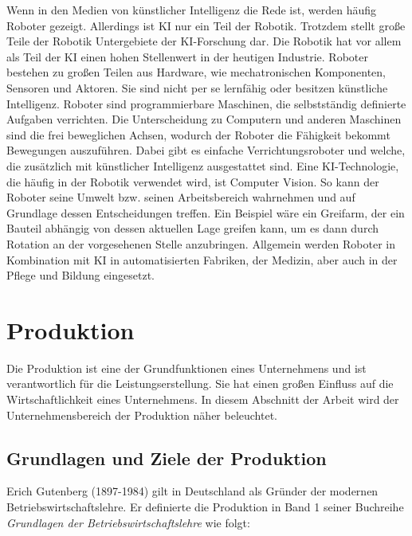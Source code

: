 \documentclass[a4paper,12pt, german]{report}
\begin{document}
Wenn in den Medien von künstlicher Intelligenz die Rede ist, werden häufig Roboter gezeigt. Allerdings ist KI nur ein Teil der Robotik. Trotzdem stellt große Teile der Robotik Untergebiete der KI-Forschung dar. Die Robotik hat vor allem als Teil der KI einen hohen Stellenwert in der heutigen Industrie.\newline
Roboter bestehen zu großen Teilen aus Hardware, wie mechatronischen Komponenten, Sensoren und Aktoren. Sie sind nicht per se lernfähig oder besitzen künstliche Intelligenz. Roboter sind programmierbare Maschinen, die selbstständig definierte Aufgaben verrichten. Die Unterscheidung zu Computern und anderen Maschinen sind die frei beweglichen Achsen, wodurch der Roboter die Fähigkeit bekommt Bewegungen auszuführen. Dabei gibt es einfache Verrichtungsroboter und welche, die zusätzlich mit künstlicher Intelligenz ausgestattet sind. Eine KI-Technologie, die häufig in der Robotik verwendet wird, ist Computer Vision. So kann der Roboter seine Umwelt bzw. seinen Arbeitsbereich wahrnehmen und auf Grundlage dessen Entscheidungen treffen. Ein Beispiel wäre ein Greifarm, der ein Bauteil abhängig von dessen aktuellen Lage greifen kann, um es dann durch Rotation an der vorgesehenen Stelle anzubringen.\newline
Allgemein werden Roboter in Kombination mit KI in automatisierten Fabriken, der Medizin, aber auch in der Pflege und Bildung eingesetzt.\cite{19}

\section{Produktion}

Die Produktion ist eine der Grundfunktionen eines Unternehmens und ist verantwortlich für die Leistungserstellung. Sie hat einen großen Einfluss auf die Wirtschaftlichkeit eines Unternehmens. In diesem Abschnitt der Arbeit wird der Unternehmensbereich der Produktion näher beleuchtet.

\subsection{Grundlagen und Ziele der Produktion}

Erich Gutenberg (1897-1984) gilt in Deutschland als Gründer der modernen Betriebswirtschaftslehre. Er definierte die Produktion in Band 1 seiner Buchreihe \textit{Grundlagen der Betriebswirtschaftslehre} wie folgt:
\end{document}
